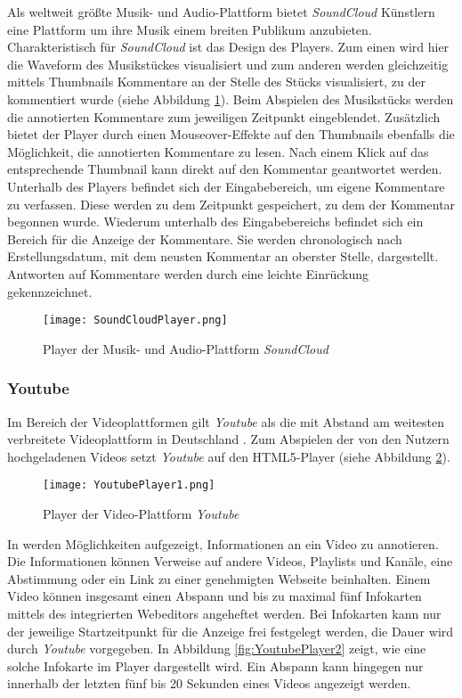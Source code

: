 \glqq Als weltweit größte Musik- und Audio-Plattform\grqq{} \citep{soundcloudinfo} bietet \textit{SoundCloud} Künstlern eine Plattform um ihre Musik einem breiten Publikum anzubieten. Charakteristisch für \textit{SoundCloud} ist das Design des Players. Zum einen wird hier die Waveform des Musikstückes visualisiert und zum anderen werden gleichzeitig mittels Thumbnails Kommentare an der Stelle des Stücks visualisiert, zu der kommentiert wurde (siehe Abbildung \ref{fig:SoundCloudPlayer}). Beim Abspielen des Musikstücks werden die annotierten Kommentare zum jeweiligen Zeitpunkt eingeblendet. Zusätzlich bietet der Player durch einen Mouseover-Effekte auf den Thumbnails ebenfalls die Möglichkeit, die annotierten Kommentare zu lesen. Nach einem Klick auf das entsprechende Thumbnail kann direkt auf den Kommentar geantwortet werden. Unterhalb des Players befindet sich der Eingabebereich, um eigene Kommentare zu verfassen. Diese werden zu dem Zeitpunkt gespeichert, zu dem der Kommentar begonnen wurde. Wiederum unterhalb des Eingabebereichs befindet sich ein Bereich für die Anzeige der Kommentare. Sie werden chronologisch nach Erstellungsdatum, mit dem neusten Kommentar an oberster Stelle, dargestellt. Antworten auf Kommentare werden durch eine leichte Einrückung gekennzeichnet.

\begin{figure}[h!]
\texttt{[image: SoundCloudPlayer.png]}
\caption{\label{fig:SoundCloudPlayer}Player der Musik- und Audio-Plattform \textit{SoundCloud} \citep{SoundCloud2015Panic}}
\end{figure}

\subsubsection{Youtube}
 
Im Bereich der Videoplattformen gilt \textit{Youtube} als die mit Abstand am weitesten verbreitete Videoplattform in Deutschland \citep{statista2016video}.  Zum Abspielen der von den Nutzern hochgeladenen Videos setzt \textit{Youtube} auf den HTML5-Player (siehe Abbildung \ref{fig:YoutubePlayer1}).

\begin{figure}[h!]
\texttt{[image: YoutubePlayer1.png]}
\caption{\label{fig:YoutubePlayer1}Player der Video-Plattform \textit{Youtube} \citep{Youtube2015Panic}}
\end{figure}

In \citep{youtubeinfokarten,youtubeabspann} werden Möglichkeiten aufgezeigt, Informationen an ein Video zu annotieren. Die Informationen können Verweise auf andere Videos, Playlists und Kanäle, eine Abstimmung oder ein Link zu einer genehmigten Webseite beinhalten. Einem Video können insgesamt einen Abspann und bis zu maximal fünf Infokarten mittels des integrierten Webeditors angeheftet werden. Bei Infokarten kann nur der jeweilige Startzeitpunkt für die Anzeige frei festgelegt werden, die Dauer wird durch \textit{Youtube} vorgegeben. In Abbildung \ref{fig:YoutubePlayer2} zeigt, wie eine solche Infokarte im Player dargestellt wird. Ein Abspann kann hingegen nur innerhalb der letzten fünf bis 20 Sekunden eines Videos angezeigt werden.

